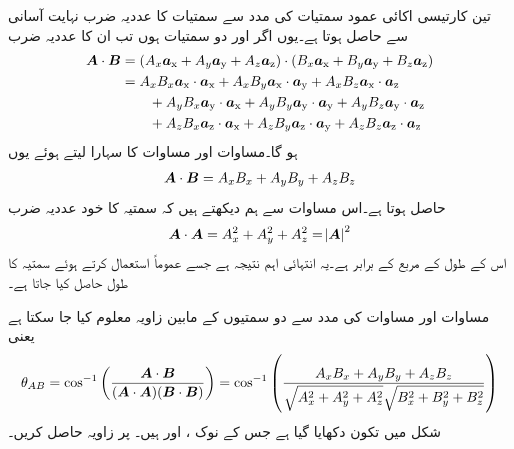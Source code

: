 تین کارتیسی  اکائی عمود   سمتیات کی مدد سے سمتیات کا عددیہ ضرب نہایت آسانی سے حاصل ہوتا ہے۔یوں اگر  اور    دو سمتیات ہوں تب ان کا عددیہ ضرب
\begin{align*}
\kvec{A} \cdot \kvec{B}&=(A_x\ax+A_y\ay+A_z\az) \cdot (B_x\ax+B_y\ay+B_z\az)\\
&=A_x B_x \ax \cdot \ax+A_x B_y \ax \cdot \ay+A_x B_z \ax \cdot \az\\
& \quad \quad +A_y B_x \ay \cdot \ax+A_y B_y \ay \cdot \ay+A_y B_z \ay \cdot \az \\
&\quad \quad +A_z B_x \az \cdot \ax+A_z B_y \az \cdot \ay+A_z B_z \az \cdot \az
\end{align*}
ہو گا۔مساوات  اور مساوات  کا سہارا لیتے ہوئے یوں
\begin{align}\label{مساوات_سمتیہ_نقطہ_ضرب_ با_مدد_اکائی_سمتیات}
\kvec{A} \cdot \kvec{B}=A_x B_x+A_y B_y+ A_z B_z
\end{align}
حاصل ہوتا ہے۔اس مساوات سے ہم دیکھتے ہیں کہ سمتیہ  کا خود عددیہ ضرب 
\begin{align}
\kvec{A} \cdot \kvec{A} =A_x^2+A_y^2+ A_z^2=\abs{\kvec{A}}^2
\end{align}
اس کے طول کے مربع کے برابر ہے۔یہ انتہائی اہم نتیجہ ہے جسے عموماً استعمال کرتے ہوئے سمتیہ کا طول حاصل کیا جاتا ہے۔

مساوات  اور مساوات  کی مدد سے دو سمتیوں کے مابین زاویہ معلوم کیا جا سکتا ہے یعنی
\begin{align}
\theta_{AB}=\cos^{-1}\left(\frac{\kvec{A} \cdot \kvec{B}}{(\kvec{A} \cdot \kvec{A})(\kvec{B} \cdot \kvec{B})}\right)=\cos^{-1} \left(\frac{A_x B_x+A_y B_y+ A_z B_z}{\sqrt{A_x^2+A_y^2+A_z^2} \sqrt{B_x^2+B_y^2+B_z^2}} \right)
\end{align}
شکل  میں تکون دکھایا گیا ہے جس کے نوک  ،  اور   ہیں۔ پر زاویہ حاصل کریں۔

